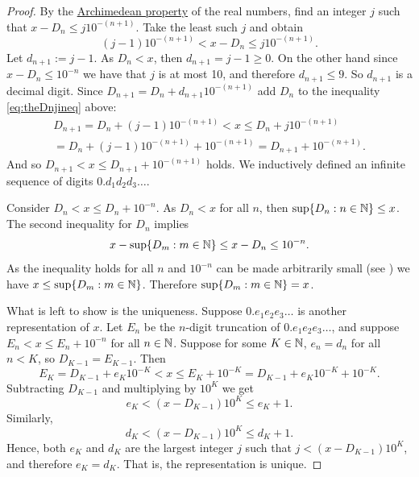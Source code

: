 \begin{proof}
By the 
\hyperref[thm:arch:i]{Archimedean property} of the real numbers,
find an integer $j$ such that
$x-D_n \leq j {10}^{-(n+1)}$.  Take the least such $j$ and obtain 
\begin{equation} \label{eq:theDnjineq}
(j-1){10}^{-(n+1)} < x-D_n \leq j {10}^{-(n+1)} .
\end{equation}
Let $d_{n+1} := j-1$.
As $D_n < x$,
then $d_{n+1} = j-1 \geq 0$.  On the other hand since
$x-D_n \leq {10}^{-n}$ we have that
$j$ is at most 10, and therefore $d_{n+1} \leq 9$.
So $d_{n+1}$ is a
decimal digit.
Since $D_{n+1} = D_n + d_{n+1} {10}^{-(n+1)}$
add $D_n$ to the inequality
\eqref{eq:theDnjineq} above:
\begin{multline*}
D_{n+1} = D_n + (j-1){10}^{-(n+1)} < x
\leq
D_n + j {10}^{-(n+1)} \\
=
D_n + (j-1) {10}^{-(n+1)} +
{10}^{-(n+1)} = D_{n+1} + {10}^{-(n+1)} .
\end{multline*}
And so
$D_{n+1} < x \leq D_{n+1} + {10}^{-(n+1)}$ holds.
We inductively
defined an infinite sequence of digits $0.d_1d_2d_3\ldots$.

Consider $D_{n} < x \leq D_{n} + {10}^{-n}$.
As $D_n < x$ for all $n$, then
$\sup \{ D_n : n \in {\mathbb{N}} \} \leq x$.
The second inequality for $D_n$ implies
\begin{equation*}
x - \sup \{ D_m : m \in {\mathbb{N}} \}
\leq
x - D_n \leq 10^{-n} .
\end{equation*}
As the inequality holds for all $n$ and
${10}^{-n}$ can be made arbitrarily small (see
) we have $x \leq 
\sup \{ D_m : m \in {\mathbb{N}} \}$.
Therefore
$\sup \{ D_m : m \in {\mathbb{N}} \} = x$.

What is left to show is the uniqueness.
Suppose $0.e_1e_2e_3\ldots$ is another representation of $x$.
Let $E_n$ be the $n$-digit truncation of $0.e_1e_2e_3\ldots$, and suppose
$E_n < x \leq E_n + {10}^{-n}$ for all $n \in {\mathbb{N}}$.
Suppose for some $K \in {\mathbb{N}}$, $e_n = d_n$ for all $n < K$, so
$D_{K-1} = E_{K-1}$.  Then
\begin{equation*}
E_K = D_{K-1} + e_K{10}^{-K} < x \leq E_K + {10}^{-K} = D_{K-1} +
e_K{10}^{-K} + {10}^{-K} .
\end{equation*}
Subtracting $D_{K-1}$ and multiplying by ${10}^{K}$ we get
\begin{equation*}
e_K < (x - D_{K-1}){10}^K \leq e_K + 1 .
\end{equation*}
Similarly,
\begin{equation*}
d_K < (x - D_{K-1}){10}^K \leq d_K + 1 .
\end{equation*}
Hence, both $e_K$ and $d_K$ are the largest integer $j$
such that $j < (x - D_{K-1}){10}^K$, and therefore $e_K = d_K$.  That is,
the representation is unique.
\end{proof}

